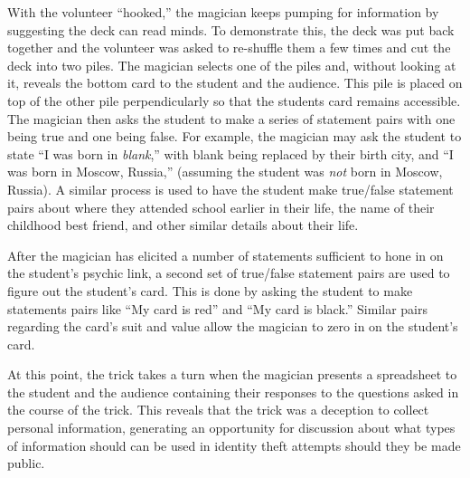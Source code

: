 With the volunteer ``hooked,'' the magician keeps pumping for information by
suggesting the deck can read minds.
To demonstrate this,
the deck was put back together and the volunteer was asked to re-shuffle them
a few times and cut the deck into two piles.
The magician
selects one of the piles and, without looking at it,
reveals the bottom card to the student and the
audience.
This pile is placed on top of the other pile perpendicularly so that
the students card remains accessible.  The magician then asks the student to
make a series of statement pairs with one being true and one being false.  For
example,  the magician may ask the student to state  ``I was born in
\textit{blank},'' with blank being replaced by their birth city, and ``I was
born in Moscow, Russia,'' (assuming the student was \textit{not} born in Moscow,
Russia).  A similar process is used to have the student make true/false
statement pairs about where they attended school earlier in their life, the name
of their childhood best friend, and other similar details about their life.

After the magician has elicited a number of statements sufficient to hone in on
the student's psychic link, a second set of true/false statement pairs are used
to figure out the student's card.  This is done by asking the student to make
statements pairs like ``My card is red'' and ``My card is black.''  Similar
pairs regarding the card's suit and value allow the magician to zero
in on the student's card.

At this point, the trick takes a turn when the magician presents a spreadsheet
to the student and the audience containing their responses to the questions
asked in the course of the trick. This reveals that the trick
was a deception to
collect personal information, generating an opportunity for discussion about what
types of information should can be used in identity theft attempts should they
be made public.


